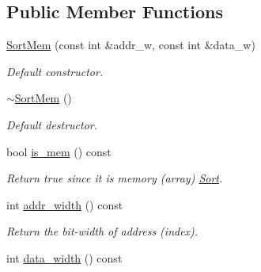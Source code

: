 \subsection*{Public Member Functions}
\begin{DoxyCompactItemize}
\item 
\mbox{\label{classilang_1_1_sort_mem_a2455b7867ad7cce9f0801496f2e467a9}} 
\mbox{\hyperlink{classilang_1_1_sort_mem_a2455b7867ad7cce9f0801496f2e467a9}{Sort\+Mem}} (const int \&addr\+\_\+w, const int \&data\+\_\+w)
\begin{DoxyCompactList}\small\item\em Default constructor. \end{DoxyCompactList}\item 
\mbox{\label{classilang_1_1_sort_mem_abb737799978d877c308f6fdbdc4e7e23}} 
\mbox{\hyperlink{classilang_1_1_sort_mem_abb737799978d877c308f6fdbdc4e7e23}{$\sim$\+Sort\+Mem}} ()
\begin{DoxyCompactList}\small\item\em Default destructor. \end{DoxyCompactList}\item 
\mbox{\label{classilang_1_1_sort_mem_a1d759adf23637c86b7e55494bca3d796}} 
bool \mbox{\hyperlink{classilang_1_1_sort_mem_a1d759adf23637c86b7e55494bca3d796}{is\+\_\+mem}} () const
\begin{DoxyCompactList}\small\item\em Return true since it is memory (array) \mbox{\hyperlink{classilang_1_1_sort}{Sort}}. \end{DoxyCompactList}\item 
\mbox{\label{classilang_1_1_sort_mem_af66c8caff3ed99050d0318778d6c2874}} 
int \mbox{\hyperlink{classilang_1_1_sort_mem_af66c8caff3ed99050d0318778d6c2874}{addr\+\_\+width}} () const
\begin{DoxyCompactList}\small\item\em Return the bit-\/width of address (index). \end{DoxyCompactList}\item 
\mbox{\label{classilang_1_1_sort_mem_af17205182f575932e7b920f26d3c9b73}} 
int \mbox{\hyperlink{classilang_1_1_sort_mem_af17205182f575932e7b920f26d3c9b73}{data\+\_\+width}} () const

\end{DoxyCompactItemize}
